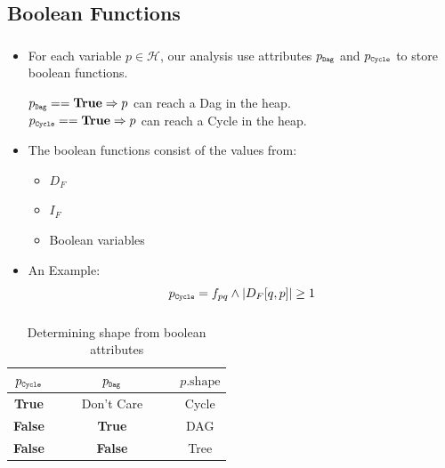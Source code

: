 \documentclass[mathserif,10pt]{beamer}
\newcommand{\cmt}[1]{}
\newcommand{\num}[1]{\ensuremath{|#1|}}
\newcommand{\Dag}{{\tt Dag}}
\newcommand{\Cycle}{{\tt Cycle}}
\newcommand{\p}{\ensuremath{p}}
\newcommand{\q}{\ensuremath{q}}
\newcommand{\shape}{\mbox{shape}}
\newcommand{\heap}{\ensuremath{\mathcal{H}}}
\newcommand{\subC}{\mbox{\scalebox{0.6}{\Cycle}}}
\newcommand{\subD}{\mbox{\scalebox{0.6}{\Dag}}}
\newcommand{\false}{\textbf{False}}
\newcommand{\true}{\textbf{True}}
\begin{document}
\subsection{Boolean Functions}
\frame
{
	\frametitle{\subsecname}
	\begin{itemize}
	\item For each variable $\p \in \heap$, our analysis use attributes $\p_{\subD}$ and $\p_{\subC}$ to store boolean functions. \\
	\begin{center}
			$\p_{\subD} == \true \Rightarrow \p$ can reach a Dag  in the heap.\\
			$\p_{\subC} == \true \Rightarrow \p$ can reach a Cycle  in the heap. 
	\end{center}
	\pause
	\item The boolean functions consist of the values from:
		\begin{itemize}
			\item $D_F$
			\item $I_F$ 
			\item Boolean variables
		\end{itemize}	
	\pause
	\item An Example:
	$$
			\p_{\subC} = f_{\p\q} \wedge \num{D_F[\q,\p]} \geq 1
	$$		
	\end{itemize}
}

\frame
{
	\frametitle{\subsecname}
	\cmt{\begin{itemize}
	\item The shape of \p, \p.\shape, can be obtained by evaluating the functions for the attributes $\p_{\subC}$ and
          $\p_{\subD}$, and using following Table.}
		  \begin{table}
			\caption{Determining shape from boolean
			  attributes}
			\begin{center}
			\begin{tabular}{|cc|cc|c| }
			\hline
			$\p_{\subC}$ &$\quad$ & $\p_{\subD}$ &$\quad$& $\p.\shape$ \\ 
			\hline
			\true  && Don't Care  && Cycle        \\ 
			\false  && \true          && DAG    \\ 
			\false  && \false          && Tree   \\ 
			\hline
			\end{tabular}
			\end{center}
		\end{table}

	\cmt{\end{itemize}}
}
\end{document}
